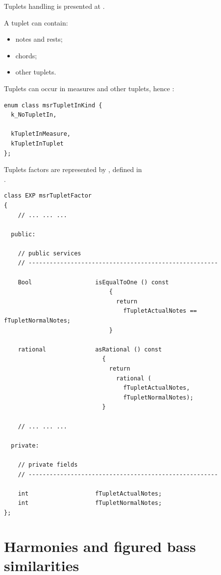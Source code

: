 Tuplets handling is presented at .

A tuplet can contain:
\begin{itemize}
\item notes and rests;
\item chords;
\item other tuplets.
\end{itemize}

Tuplets can occur in measures and other tuplets, hence :
\begin{lstlisting}[language=CPlusPlus]
enum class msrTupletInKind {
  k_NoTupletIn,

  kTupletInMeasure,
  kTupletInTuplet
};
\end{lstlisting}

Tuplets factors are represented by , defined in\\
.
\begin{lstlisting}[language=CPlusPlus]
class EXP msrTupletFactor
{
	// ... ... ...

  public:

    // public services
    // ------------------------------------------------------

    Bool                  isEqualToOne () const
                              {
                                return
                                  fTupletActualNotes == fTupletNormalNotes;
                              }

    rational              asRational () const
                            {
                              return
                                rational (
                                  fTupletActualNotes,
                                  fTupletNormalNotes);
                            }

	// ... ... ...

  private:

    // private fields
    // ------------------------------------------------------

    int                   fTupletActualNotes;
    int                   fTupletNormalNotes;
};
\end{lstlisting}


\section{Harmonies and figured bass similarities}\label{Harmonies and figured bass similarities}

